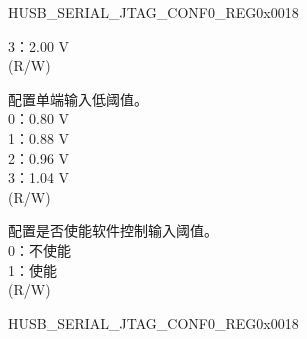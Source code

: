 {\begin{register}{H}{USB\_SERIAL\_JTAG\_CONF0\_REG}{0x0018}
\begin{regdesc}
\begin{reglist}
3：2.00 V\\
(R/W)
\label{fielddesc:USBSERIALJTAGVREFL}\item [USB\_SERIAL\_JTAG\_VREFL] 配置单端输入低阈值。\\
0：0.80 V\\
1：0.88 V\\
2：0.96 V\\
3：1.04 V\\
(R/W)
\label{fielddesc:USBSERIALJTAGVREFOVERRIDE}\item [USB\_SERIAL\_JTAG\_VREF\_OVERRIDE] 配置是否使能软件控制输入阈值。\\
0：不使能\\
1：使能\\
(R/W)

\item [见下页...]
\end{reglist}\end{regdesc}
\end{register}
\addtocounter{Regfloat}{-1}
\begin{register}{H}{USB\_SERIAL\_JTAG\_CONF0\_REG}{0x0018}
\begin{regdesc}\begin{reglist}
\item [接上页...]


\end{reglist}
\end{regdesc}
\end{register}}

